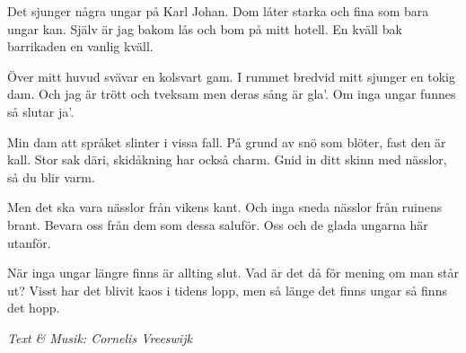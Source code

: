 \vspace{10pt}
Det sjunger några ungar på Karl Johan.
Dom låter starka och fina som bara ungar kan.
Själv är jag bakom lås och bom på mitt hotell.
En kväll bak barrikaden en vanlig kväll.

Över mitt huvud svävar en kolsvart gam.
I rummet bredvid mitt sjunger en tokig dam.
Och jag är trött och tveksam men deras sång är gla'.
Om inga ungar funnes så slutar ja'.

Min dam att språket slinter i vissa fall.
På grund av snö som blöter, fast den är kall.
Stor sak däri, skidåkning har också charm.
Gnid in ditt skinn med nässlor, så du blir varm.

Men det ska vara nässlor från vikens kant.
Och inga sneda nässlor från ruinens brant.
Bevara oss från dem som dessa saluför.
Oss och de glada ungarna här utanför.

När inga ungar längre finns är allting slut.
Vad är det då för mening om man står ut?
Visst har det blivit kaos i tidens lopp,
men så länge det finns ungar så finns det hopp.\par
\vspace{10pt}
{\footnotesize\textit{Text \& Musik: Cornelis Vreeswijk}}

